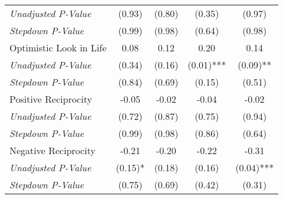 \begin{tabular}{l c c c c}
\quad \textit{Unadjusted P-Value} & (0.93) & (0.80) & (0.35) & (0.97) & \\
\quad \textit{Stepdown P-Value} & (0.99) & (0.98) & (0.64) & (0.98) & \\
Optimistic Look in Life & 0.08 & 0.12 & 0.20 & 0.14 & \\
\quad \textit{Unadjusted P-Value} & (0.34) & (0.16) & (0.01)*** & (0.09)** & \\
\quad \textit{Stepdown P-Value} & (0.84) & (0.69) & (0.15) & (0.51) & \\
Positive Reciprocity & -0.05 & -0.02 & -0.04 & -0.02 & \\
\quad \textit{Unadjusted P-Value} & (0.72) & (0.87) & (0.75) & (0.94) & \\
\quad \textit{Stepdown P-Value} & (0.99) & (0.98) & (0.86) & (0.64) & \\
Negative Reciprocity & -0.21 & -0.20 & -0.22 & -0.31 & \\
\quad \textit{Unadjusted P-Value} & (0.15)* & (0.18) & (0.16) & (0.04)*** & \\
\quad \textit{Stepdown P-Value} & (0.75) & (0.69) & (0.42) & (0.31) & \\
\bottomrule
\end{tabular}
